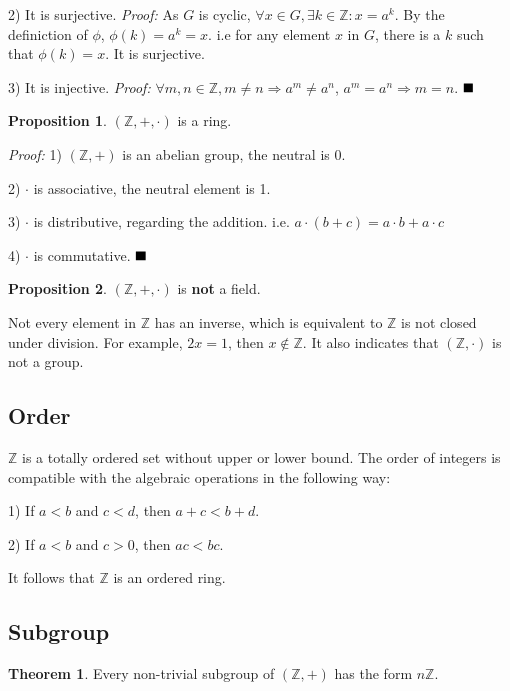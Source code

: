 \documentclass{article}
\theoremstyle{definition}
\newtheorem{theorem}{Theorem}[section]
\newtheorem{proposition}{Proposition}[section]
\begin{document}
2) It is surjective. \textit{Proof:} As $G$ is cyclic, $\forall x\in G, \exists k \in \mathbb{Z} : x=a^k$. By the definiction of $\phi$, $\phi(k) = a^k = x$. i.e for any element $x$ in $G$, there is a $k$ such that $\phi(k)=x$. It is surjective.

3) It is injective. \textit{Proof:} $\forall m,n \in \mathbb{Z}, m \neq n \Rightarrow a^m \neq a^n$, $a^m=a^n \Rightarrow m=n$. $\hfill\blacksquare$

\begin{proposition}
$(\mathbb{Z},+,\cdot)$ is a ring.
\end{proposition}

\textit{Proof:} 1) $(\mathbb{Z},+)$ is an abelian group, the neutral is 0.

2) $\cdot$ is associative, the neutral element is 1.

3) $\cdot$ is distributive, regarding the addition. i.e. $a\cdot(b+c) = a\cdot b +a\cdot c$

4) $\cdot$ is commutative. $\hfill\blacksquare$

\begin{proposition}
$(\mathbb{Z},+,\cdot)$ is \textbf{not} a field.
\end{proposition}
Not every element in $\mathbb{Z}$ has an inverse, which is equivalent to $\mathbb{Z}$ is not closed under division. For example, $2x=1$, then $x\notin \mathbb{Z}$. It also indicates that $(\mathbb{Z}, \cdot)$ is not a group.

\subsection{Order}

$\mathbb{Z}$ is a totally ordered set without upper or lower bound. The order of integers is compatible with the algebraic operations in the following way:

1) If $a<b$ and $c<d$, then $a+c<b+d$.

2) If $a<b$ and $c>0$, then $ac<bc$.

It follows that $\mathbb{Z}$ is an ordered ring.

\subsection{Subgroup}

\begin{theorem}
Every non-trivial subgroup of $(\mathbb{Z},+)$ has the form $n\mathbb{Z}$.
\end{theorem}
\end{document}
